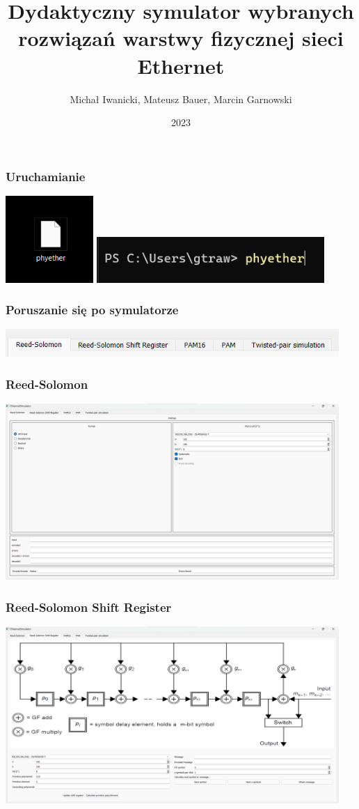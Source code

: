 \documentclass{beamer}
\title{\Large\textbf{Dydaktyczny symulator wybranych rozwiązań warstwy fizycznej sieci Ethernet}}
\author{Michał Iwanicki, Mateusz Bauer, Marcin Garnowski}
\institute{Politechnika Gdańska}
\date{2023}
\begin{document}
\frame{\titlepage}

\begin{frame}
\frametitle{Uruchamianie}
\includegraphics[width=0.25\textwidth]{images/prezentacja_start1.png}
\hfill
\includegraphics[width=0.65\textwidth]{images/prezentacja_start2.png}
\end{frame}

\begin{frame}
\frametitle{Poruszanie się po symulatorze}
\includegraphics[width=0.95\textwidth]{images/zakladki.png}
\end{frame}

\begin{frame}
\frametitle{Reed-Solomon}
\includegraphics[width=0.95\textwidth]{images/prezentacja_rs.png}
\end{frame}

\begin{frame}
\frametitle{Reed-Solomon Shift Register}
\includegraphics[width=0.95\textwidth]{images/prezentacja_rs_sr.png}
\end{frame}
\end{document}
